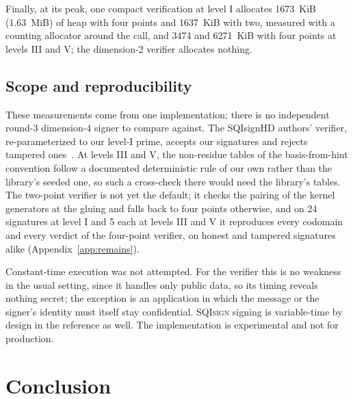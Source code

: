 \documentclass[version=preprint]{iacrcc}
\newcommand{\SQIsign}{SQI{\textsc{sign}}}
\begin{document}
    Finally, at its peak, one compact verification at level I allocates
    1673~KiB (1.63~MiB) of heap with four points and 1637~KiB with two,
    measured with a counting allocator around the call, and 3474 and 6271~KiB
    with four points at levels III and V; the dimension-2 verifier allocates
    nothing.

    \subsection{Scope and reproducibility}
    \label{sec:scope}
    These measurements come from one implementation; there is no independent
    round-3 dimension-4 signer to compare against. The SQIsignHD authors'
    verifier, re-parameterized to our level-I prime, accepts our signatures and
    rejects tampered ones~\cite{DLRW25}. At levels III and V, the non-residue
    tables of the basis-from-hint convention follow a documented deterministic
    rule of our own rather than the library's seeded one, so such a cross-check
    there would need the library's tables.   The
    two-point verifier is not yet the default; it checks the pairing of the
    kernel generators at the gluing and falls back to four points otherwise, and
    on 24 signatures at level I and 5 each at levels III and V it reproduces
    every codomain and every verdict of the four-point verifier, on honest and
    tampered signatures alike (Appendix~\ref{app:remains}).

    Constant-time execution was not attempted. For the verifier this is no
    weakness in the usual setting, since it handles only public data, so its
    timing reveals nothing secret; the exception is an application in which
    the message or the signer's identity must itself stay confidential.
    {\SQIsign} signing is variable-time by design in the reference as well. The
    implementation is experimental and not for production.

    \section{Conclusion}
    \label{sec:conc}
\end{document}
